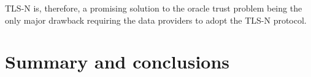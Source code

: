 TLS-N is, therefore, a promising solution to the oracle trust problem being the only major drawback requiring the data providers to adopt the TLS-N protocol.


\section{Summary and conclusions}

